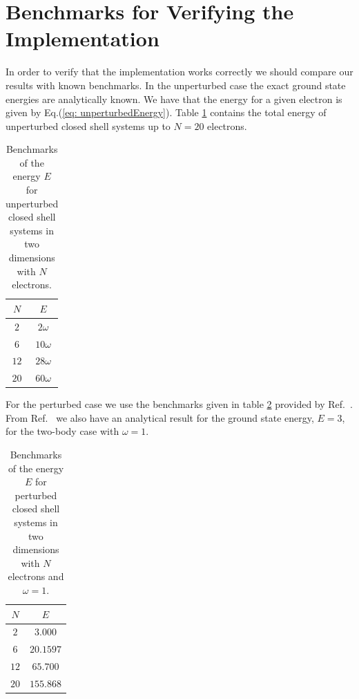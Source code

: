 \documentclass[../main.tex]{subfiles}
\begin{document}
\section{Benchmarks for Verifying the Implementation}
In order to verify that the implementation works correctly we should compare our results with known benchmarks. In the unperturbed case the exact ground state energies are analytically known. We have that the energy for a given electron is given by Eq.(\ref{eq: unperturbedEnergy}). Table \ref{tab: unperturbedEnergies} contains the total energy of unperturbed closed shell systems up to $N=20$ electrons.
\begin{table}[!ht]
  \centering
  \begin{tabular}{ | c | c | }
    \hline
     $N$ & $E$ \\*
    \hline
     $2$ & $2\omega$ \\*
    \hline
     $6$ & $10\omega$ \\*
    \hline
    $12$ & $28\omega$ \\*
    \hline
    $20$ & $60\omega$ \\*
    \hline
  \end{tabular}
  \caption{Benchmarks of the energy $E$ for unperturbed closed shell systems in two dimensions with $N$ electrons.}
  \label{tab: unperturbedEnergies}
\end{table}

For the perturbed case we use the benchmarks given in table \ref{tab: perturbedEnergies} provided by Ref.~\cite{QDotBenchmarks}. From Ref.~\cite{Taut} we also have an analytical result for the ground state energy, $E=3$, for the two-body case with $\omega=1$.
\begin{table}[!ht]
  \centering
  \begin{tabular}{ | c | c | }
    \hline
     $N$ & $E$ \\*
    \hline
     $2$ & $3.000$ \\*
    \hline
     $6$ & $20.1597$ \\*
    \hline
    $12$ & $65.700$ \\*
    \hline
    $20$ & $155.868$ \\*
    \hline
  \end{tabular}
  \caption{Benchmarks of the energy $E$ for perturbed closed shell systems in two dimensions with $N$ electrons and $\omega=1$.}
  \label{tab: perturbedEnergies}
\end{table}
\end{document}

